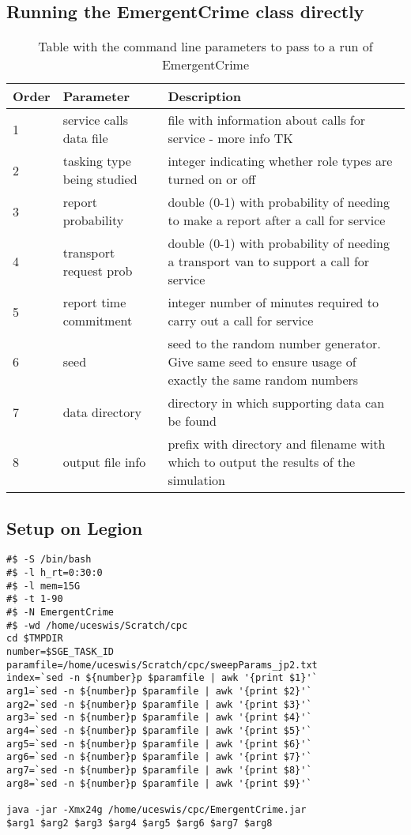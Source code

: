 \documentclass[11pt]{article} %
\begin{document}
\subsection{Running the EmergentCrime class directly}

\begin{table}[]
\centering
\caption{Table with the command line parameters to pass to a run of EmergentCrime}
\label{my-label}
\begin{tabular}{p{1cm}p{4cm}p{6cm}} %
\toprule
{\color[HTML]{C0C0C0} } Order & {\color[HTML]{C0C0C0} } Parameter & {\color[HTML]{C0C0C0} } Description \\ \midrule
1  &  service calls data file & file with information about calls for service - more info TK \\
2  &  tasking type being studied &  integer indicating whether role types are turned on or off \\
3  &  report probability &  double (0-1) with probability of needing to make a report after a call for service \\
4  &  transport request prob & double (0-1) with probability of needing a transport van to support a call for service \\
5  &  report time commitment &  integer number of minutes required to carry out a call for service\\
6  & seed &  seed to the random number generator. Give same seed to ensure usage of exactly the same random numbers \\
7  &  data directory &  directory in which supporting data can be found \\ 
8 & output file info & prefix with directory and filename with which to output the results of the simulation \\ \bottomrule
\end{tabular}
\end{table}

\subsection{Setup on Legion}

\begin{lstlisting}
#$ -S /bin/bash
#$ -l h_rt=0:30:0
#$ -l mem=15G
#$ -t 1-90
#$ -N EmergentCrime
#$ -wd /home/uceswis/Scratch/cpc
cd $TMPDIR
number=$SGE_TASK_ID
paramfile=/home/uceswis/Scratch/cpc/sweepParams_jp2.txt
index=`sed -n ${number}p $paramfile | awk '{print $1}'`
arg1=`sed -n ${number}p $paramfile | awk '{print $2}'`
arg2=`sed -n ${number}p $paramfile | awk '{print $3}'`
arg3=`sed -n ${number}p $paramfile | awk '{print $4}'`
arg4=`sed -n ${number}p $paramfile | awk '{print $5}'`
arg5=`sed -n ${number}p $paramfile | awk '{print $6}'`
arg6=`sed -n ${number}p $paramfile | awk '{print $7}'`
arg7=`sed -n ${number}p $paramfile | awk '{print $8}'`
arg8=`sed -n ${number}p $paramfile | awk '{print $9}'`

java -jar -Xmx24g /home/uceswis/cpc/EmergentCrime.jar 
$arg1 $arg2 $arg3 $arg4 $arg5 $arg6 $arg7 $arg8

\end{lstlisting}
\end{document}

